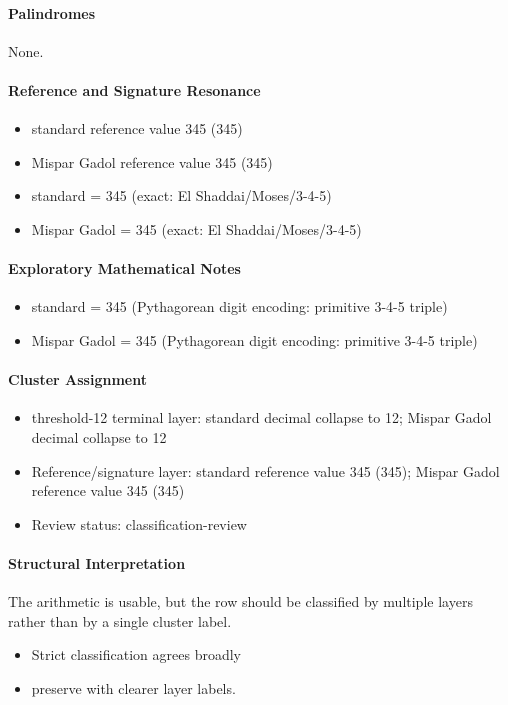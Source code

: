 \paragraph{Palindromes}
None.
\paragraph{Reference and Signature Resonance}
\begin{itemize}
\item standard reference value 345 (345)
\item Mispar Gadol reference value 345 (345)
\item standard = 345 (exact: El Shaddai/Moses/3-4-5)
\item Mispar Gadol = 345 (exact: El Shaddai/Moses/3-4-5)
\end{itemize}
\paragraph{Exploratory Mathematical Notes}
\begin{itemize}
\item standard = 345 (Pythagorean digit encoding: primitive 3-4-5 triple)
\item Mispar Gadol = 345 (Pythagorean digit encoding: primitive 3-4-5 triple)
\end{itemize}
\paragraph{Cluster Assignment}
\begin{itemize}
\item threshold-12 terminal layer: standard decimal collapse to 12; Mispar Gadol decimal collapse to 12
\item Reference/signature layer: standard reference value 345 (345); Mispar Gadol reference value 345 (345)
\item Review status: classification-review
\end{itemize}
\paragraph{Structural Interpretation}
The arithmetic is usable, but the row should be classified by multiple layers rather than by a single cluster label.

\begin{itemize}
\item Strict classification agrees broadly
\item preserve with clearer layer labels.
\end{itemize}

